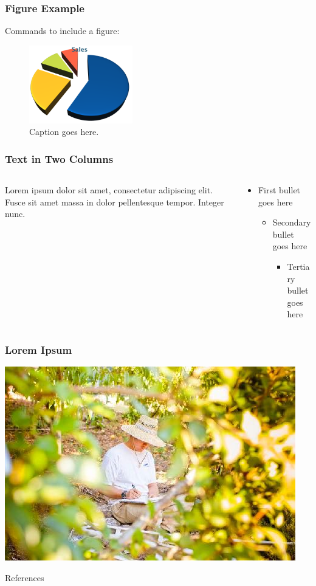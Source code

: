 \documentclass[9pt,xcolor={table,dvipsnames},t,aspectratio=169,onlytextwidth,mathserif]{beamer}
\begin{document}
\begin{frame}
\frametitle{Figure Example}

Commands to include a figure:

\begin{figure}
\includegraphics[width=0.4\textwidth]{chart}
\caption{\label{fig:your-figure}Caption goes here.}
\end{figure}
\end{frame}

{
\normalframetitle
\begin{frame}
\frametitle{Text in Two Columns}

\begin{columns}[T]

\begin{column}{0.48\textwidth}
\small
Lorem ipsum dolor sit amet, consectetur adipiscing elit. Fusce sit amet massa in dolor pellentesque tempor. Integer nunc. 
\end{column}

\begin{column}{0.48\textwidth}
\begin{itemize}
\item First bullet goes here
  \begin{itemize}
  \item Secondary bullet goes here
    \begin{itemize}
    \item Tertiary bullet goes here
    \end{itemize}
  \end{itemize}
\end{itemize}
\end{column}

\end{columns}
\end{frame}
}

\begin{frame}
\frametitle{Lorem Ipsum}

\includegraphics[width=.65\textwidth,height=.5\textheight]{photo}

\end{frame}

\begin{frame}[allowframebreaks]{References}
\tiny
    
    
\end{frame}
\end{document}
